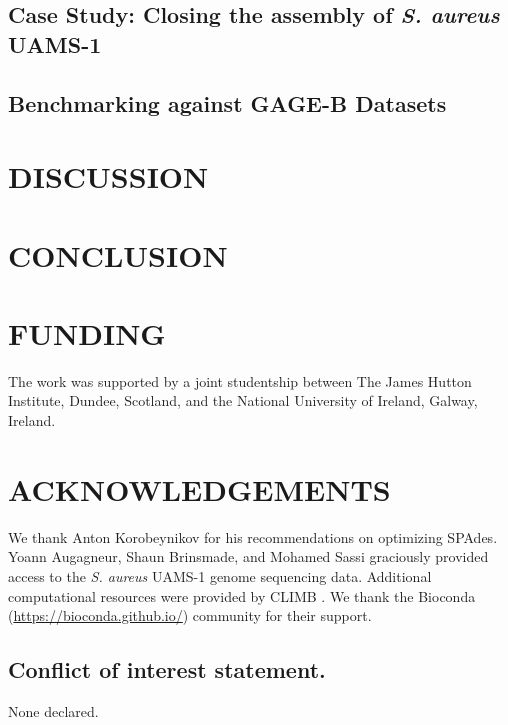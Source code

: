 \documentclass[a4,center,fleqn]{NAR}
\begin{document}




\subsection*{Case Study: Closing the assembly of \textit{S. aureus} UAMS-1}



\subsection*{Benchmarking against GAGE-B Datasets}





\section*{DISCUSSION}



\section*{CONCLUSION}



\section{FUNDING}
The work was supported by a joint studentship between The James Hutton Institute, Dundee, Scotland, and the National University of Ireland, Galway, Ireland.


\section{ACKNOWLEDGEMENTS}
We thank Anton Korobeynikov for his recommendations on optimizing SPAdes. Yoann Augagneur, Shaun Brinsmade, and Mohamed Sassi graciously provided access to the \textit{S. aureus} UAMS-1 genome sequencing data.  Additional computational resources were provided by CLIMB \cite{Connor2016}. We thank the Bioconda (\url{https://bioconda.github.io/}) community for their support.


\subsection{Conflict of interest statement.}
None declared.



\end{document}
